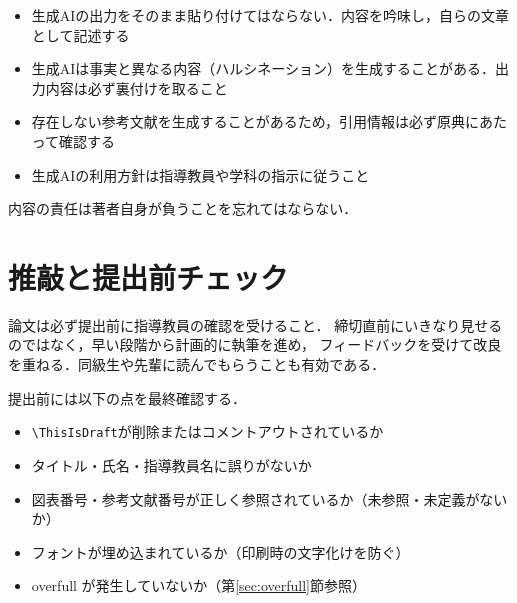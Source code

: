 \begin{itemize}
    \item 生成AIの出力をそのまま貼り付けてはならない．内容を吟味し，自らの文章として記述する
    \item 生成AIは事実と異なる内容（ハルシネーション）を生成することがある．出力内容は必ず裏付けを取ること
    \item 存在しない参考文献を生成することがあるため，引用情報は必ず原典にあたって確認する
    \item 生成AIの利用方針は指導教員や学科の指示に従うこと
\end{itemize}
内容の責任は著者自身が負うことを忘れてはならない．

\section{推敲と提出前チェック}
\label{sec:proofreading}
論文は必ず提出前に指導教員の確認を受けること．
締切直前にいきなり見せるのではなく，早い段階から計画的に執筆を進め，
フィードバックを受けて改良を重ねる．同級生や先輩に読んでもらうことも有効である．

提出前には以下の点を最終確認する\cite{ipsj-sample}．
\begin{itemize}
    \item \verb|\ThisIsDraft|が削除またはコメントアウトされているか
    \item タイトル・氏名・指導教員名に誤りがないか
    \item 図表番号・参考文献番号が正しく参照されているか（未参照・未定義がないか）
    \item フォントが埋め込まれているか（印刷時の文字化けを防ぐ）
    \item overfull が発生していないか（第\ref{sec:overfull}節参照）
\end{itemize}
